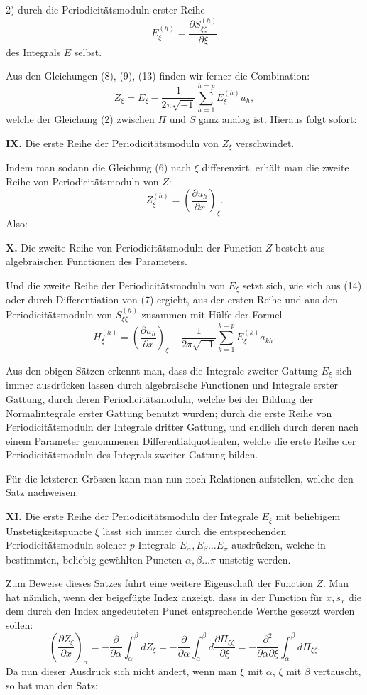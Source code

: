 \documentclass[10pt]{article}
\begin{document}
2) durch die Periodicitätsmoduln erster Reihe
\[
\tag{13}
E_\xi^{(h)}=\frac{\partial S_{\xi\zeta}^{(h)}}{\partial \xi}
\]
des Integrals \(E\) selbst.

Aus den Gleichungen (8), (9), (13) finden wir ferner die Combination:
\[
\tag{14}
Z_\xi=E_\xi-\frac{1}{2\pi\sqrt{-1}}\sum_{h=1}^{h=p}E_\xi^{(h)}u_h,
\]
welche der Gleichung (2) zwischen \(\Pi\) und \(S\) ganz analog ist. Hieraus folgt sofort:

\noindent\textbf{IX.} Die erste Reihe der Periodicitätsmoduln von \(Z_\xi\) verschwindet.

Indem man sodann die Gleichung (6) nach \(\xi\) differenzirt, erhält man die zweite Reihe von Periodicitätsmoduln von \(Z\):
\[
\tag{15}
Z_\xi^{(h)}=\left(\frac{\partial u_h}{\partial x}\right)_\xi.
\]
Also:

\noindent\textbf{X.} Die zweite Reihe von Periodicitätsmoduln der Function \(Z\) besteht aus algebraischen Functionen des Parameters.

Und die zweite Reihe der Periodicitätsmoduln von \(E_\xi\) setzt sich, wie sich aus (14) oder durch Differentiation von (7) ergiebt, aus der ersten Reihe und aus den Periodicitätsmoduln von \(S_{\xi\zeta}^{(h)}\) zusammen mit Hülfe der Formel
\[
\tag{16}
H_\xi^{(h)}=\left(\frac{\partial u_h}{\partial x}\right)_\xi
+\frac{1}{2\pi\sqrt{-1}}\sum_{k=1}^{k=p}E_\xi^{(k)}a_{kh}.
\]

Aus den obigen Sätzen erkennt man, dass die Integrale zweiter Gattung \(E_\xi\) sich immer ausdrücken lassen durch algebraische Functionen und Integrale erster Gattung, durch deren Periodicitätsmoduln, welche bei der Bildung der Normalintegrale erster Gattung benutzt wurden; durch die erste Reihe von Periodicitätsmoduln der Integrale dritter Gattung, und endlich durch deren nach einem Parameter genommenen Differentialquotienten, welche die erste Reihe der Periodicitätsmoduln des Integrals zweiter Gattung bilden.

Für die letzteren Grössen kann man nun noch Relationen aufstellen, welche den Satz nachweisen:

\noindent\textbf{XI.} Die erste Reihe der Periodicitätsmoduln der Integrale \(E_\xi\) mit beliebigem Unstetigkeitspuncte \(\xi\) lässt sich immer durch die entsprechenden Periodicitätsmoduln solcher \(p\) Integrale \(E_\alpha,E_\beta\ldots E_\pi\) ausdrücken, welche in bestimmten, beliebig gewählten Puncten \(\alpha,\beta\ldots\pi\) unstetig werden.

Zum Beweise dieses Satzes führt eine weitere Eigenschaft der Function \(Z\). Man hat nämlich, wenn der beigefügte Index anzeigt, dass in der Function für \(x,s_x\) die dem durch den Index angedeuteten Punct entsprechende Werthe gesetzt werden sollen:
\[
\left(\frac{\partial Z_\xi}{\partial x}\right)_\alpha
=-\frac{\partial}{\partial\alpha}\int_{\alpha}^{\beta}dZ_\xi
=-\frac{\partial}{\partial\alpha}\int_{\alpha}^{\beta}d\frac{\partial\Pi_{\xi\zeta}}{\partial\xi}
=-\frac{\partial^2}{\partial\alpha\partial\xi}\int_{\alpha}^{\beta}d\Pi_{\xi\zeta}.
\]
Da nun dieser Ausdruck sich nicht ändert, wenn man \(\xi\) mit \(\alpha\), \(\zeta\) mit \(\beta\) vertauscht, so hat man den Satz:
\end{document}
